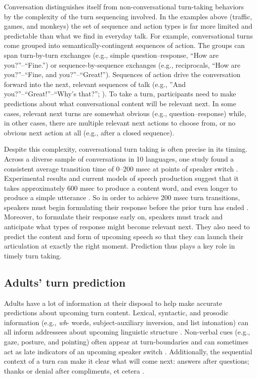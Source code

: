 \documentclass[authoryear, 12pt]{elsarticle}
\begin{document}
Conversation distinguishes itself from non-conversational turn-taking behaviors by the complexity of the turn sequencing involved. In the examples above (traffic, games, and monkeys) the set of sequence and action types is far more limited and predictable than what we find in everyday talk. For example, conversational turns come grouped into semantically-contingent sequences of action. The groups can span turn-by-turn exchanges (e.g., simple question--response, ``How are you?''--``Fine.'') or sequence-by-sequence exchanges (e.g., reciprocals, ``How are you?''--``Fine, and you?''--``Great!''). Sequences of action drive the conversation forward into the next, relevant sequences of talk (e.g., ''And you?''--``Great!''--``Why's that?''; \citealp{schegloff2007}). To take a turn, participants need to make predictions about what conversational content will be relevant next. In some cases, relevant next turns are somewhat obvious (e.g., question--response) while, in other cases, there are multiple relevant next actions to choose from, or no obvious next action at all (e.g., after a closed sequence).

Despite this complexity, conversational turn taking is often precise in its timing. Across a diverse sample of conversations in 10 languages, one study found a consistent average transition time of 0--200 msec at points of speaker switch \citep{stivers2009}. Experimental results and current models of speech production suggest that it takes approximately 600 msec to produce a content word, and even longer to produce a simple utterance \citep{griffin2000, levelt1989}. So in order to achieve 200 msec turn transitions, speakers must begin formulating their response before the prior turn has ended \citep{levinson2013}. Moreover, to formulate their response early on, speakers must track and anticipate what types of response might become relevant next. They also need to predict the content and form of upcoming speech so that they can launch their articulation at exactly the right moment. Prediction thus plays a key role in timely turn taking.

\subsection{Adults' turn prediction}

Adults have a lot of information at their disposal to help make accurate predictions about upcoming turn content. Lexical, syntactic, and prosodic information (e.g., \textit{wh}- words, subject-auxiliary inversion, and list intonation) can all inform addressees about upcoming linguistic structure \citep{de-ruiter2006, duncan1972, ford1996, torreiraUndRev}. Non-verbal cues (e.g., gaze, posture, and pointing) often appear at turn-boundaries and can sometimes act as late indicators of an upcoming speaker switch \citep{rossano2009, stivers2010}. Additionally, the sequential context of a turn can make it clear what will come next: answers after questions; thanks or denial after compliments, et cetera \citep{schegloff2007}.
\end{document}

